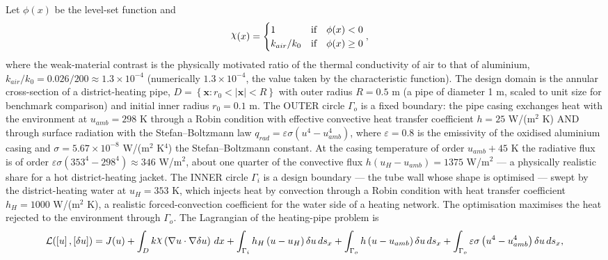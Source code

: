 \documentclass[preview]{standalone}
\let\oldcdot\cdot
\let\cdot\oldcdot
\begin{document}
Let $\phi(x)$ be the level-set function and
 \begin{align*}\raisebox{\depth}{$\chi$}(x) &= \begin{cases} 1 & \mbox{if}\quad \phi(x) < 0 \\ k_{air}/k_0 & \mbox{if}\quad \phi(x)  \ge 0 \end{cases},\end{align*}
where the weak-material contrast is the physically motivated ratio of the thermal conductivity of air to that of aluminium, $k_{air}/k_0 = 0.026/200 \approx 1.3 \times 10^{-4}$ (numerically $1.3 \times 10^{-4}$, the value taken by the characteristic function).
The design domain is the annular cross-section of a district-heating pipe, $D = \left\{ \mathbf x : r_0 < \left|\mathbf x\right| < R \right\}$ with outer radius $R = 0.5$ m (a pipe of diameter 1 m, scaled to unit size for benchmark comparison) and initial inner radius $r_0 = 0.1$ m.  The OUTER circle $\Gamma_o$ is a fixed boundary: the pipe casing exchanges heat with the environment at $u_{amb} = 298$ K through a Robin condition with effective convective heat transfer coefficient $h = 25$ W/(m$^{2}$ K) AND through surface radiation with the Stefan--Boltzmann law $q_{rad} = \varepsilon \sigma \left( u^{4} - u_{amb}^{4}\right)$, where $\varepsilon = 0.8$ is the emissivity of the oxidised aluminium casing and $\sigma = 5.67 \times 10^{-8}$ W/(m$^{2}$ K$^{4}$) the Stefan--Boltzmann constant.  At the casing temperature of order $u_{amb} + 45$ K the radiative flux is of order $\varepsilon \sigma \left(353^{4} - 298^{4}\right) \approx 346$ W/m$^{2}$, about one quarter of the convective flux $h\left(u_H - u_{amb}\right) = 1375$ W/m$^{2}$ — a physically realistic share for a hot district-heating jacket.  The INNER circle $\Gamma_i$ is a design boundary — the tube wall whose shape is optimised — swept by the district-heating water at $u_H = 353$ K, which injects heat by convection through a Robin condition with heat transfer coefficient $h_H = 1000$ W/(m$^{2}$ K), a realistic forced-convection coefficient for the water side of a heating network.  The optimisation maximises the heat rejected to the environment through $\Gamma_o$.
The Lagrangian of the heating-pipe problem is
\begin{dmath*}
\mathcal L(\left[ u\right],\left[ \delta u\right]) = J(u) +  \int_{D} k \raisebox{\depth}{$\chi$} \left(  \nabla u  \cdot  \nabla \delta u  \right) \,dx + \int_{\Gamma_i} h_H \left( u - u_{H}\right) \delta u \,ds_x + \int_{\Gamma_o} h \left( u - u_{amb}\right) \delta u \,ds_x + \int_{\Gamma_o} \varepsilon \sigma \left( u^{4} - u_{amb}^{4}\right) \delta u \,ds_x ,
\end{dmath*}
\end{document}
